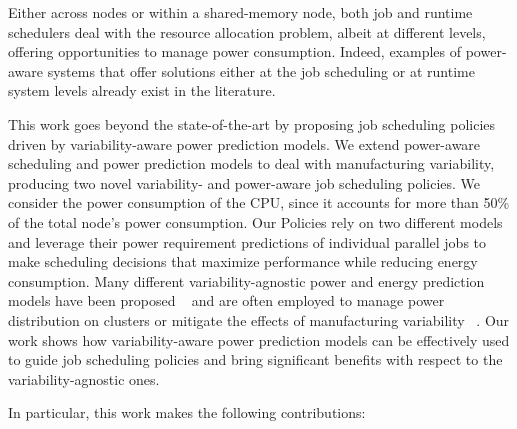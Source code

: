 Either across nodes or within a shared-memory node, both job and runtime schedulers deal
with the resource allocation problem, albeit at different levels, offering opportunities
to manage power consumption.  Indeed, examples of power-aware systems  that offer
solutions either at the job scheduling
\cite{Gholkar:2016:PTH:2967938.2967961,7515666,Ellsworth:2015:DPS:2807591.2807643,Etinski2012615}
or at runtime system  \cite{Gholkar:2016:PTH:2967938.2967961,
Chasapis:2016:RMM:2925426.2926279,Totoni:tech:2014,Teodorescu:2008:VAS:1381306.1382152,Inadomi:2015:AMI:2807591.2807638}
levels already exist in the literature.

This work goes beyond the state-of-the-art by proposing job scheduling policies driven by
variability-aware power prediction models.  We extend power-aware scheduling and power
prediction models to deal with manufacturing variability,  producing two novel
variability- and power-aware job scheduling policies.  We consider the power consumption
of the CPU, since it accounts for more than 50\%
\cite{ShuaiwenSong:2009:EPA:1572226.1572228} of the total node's power consumption.  Our
Policies rely on two different models and leverage their power requirement predictions of
individual parallel jobs to make scheduling decisions that maximize performance while
reducing energy consumption.  Many different variability-agnostic power and energy
prediction models have been proposed
~\cite{Bircher:2012:CSP:2196827.2196987,Bertran:2012:SEC:2457472.2457499,Bertran:2010:DRP:1810085.1810108,Goel:2010:PSP:1909624.1909734,Isci:2003:RPM:956417.956567}
and are often employed to manage power distribution on clusters or mitigate the effects of
manufacturing variability
~\cite{Chasapis:2016:RMM:2925426.2926279,Inadomi:2015:AMI:2807591.2807638,Gholkar:2016:PTH:2967938.2967961,Ellsworth:2015:DPS:2807591.2807643,Bailey:2015:FLP:2807591.2807637,Teodorescu:2008:VAS:1381306.1382152,Totoni:tech:2014}.
Our work shows how variability-aware power prediction models can be effectively used to
guide job scheduling policies and bring significant benefits with respect to the
variability-agnostic ones.
\par
In particular, this work makes the following contributions:
